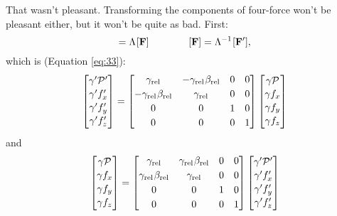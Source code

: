 \documentclass[12pt]{article}
\renewcommand{\vv}[1]{\mathbf{#1}}
\begin{document}
That wasn't pleasant. Transforming the components of four-force won't be pleasant either, but it won't be quite as bad. First:
\begin{equation*}
[\vv F^\prime] = \Lambda \mkern1mu [\vv F] \qquad \qquad [\vv F] = \Lambda^{-1} \mkern1mu [\vv F^\prime] ,
\end{equation*}
which is (Equation \ref{eq:33}):
\begin{equation*}
\begin{bmatrix}
\gamma^\prime \mathcal{P}^\prime \\[.15 em]
\gamma^\prime f_x^\prime \\[.15 em]
\gamma^\prime f_y^\prime \\[.15 em]
\gamma^\prime f_z^\prime\\[.1 em]
\end{bmatrix}
=
\begin{bmatrix}
\gamma_{\textrm{rel}} & -\gamma_{\textrm{rel}} \mkern1mu \beta_{\textrm{rel}} & 0 & 0 \\[.25 em]
- \gamma_{\textrm{rel}} \mkern1mu \beta_{\textrm{rel}} & \gamma_{\textrm{rel}} & 0 & 0 \\[.25 em]
0 & 0 & 1 & 0 \\[.25 em]
0 & 0 & 0 & 1
\end{bmatrix}
\begin{bmatrix}
\gamma \mathcal{P} \\[.15 em]
\gamma f_x \\[.15 em]
\gamma f_y \\[.15 em]
\gamma f_z \\[.1 em]
\end{bmatrix}
\end{equation*}
and
\begin{equation*}
\begin{bmatrix}
\gamma \mathcal{P} \\[.15 em]
\gamma f_x \\[.15 em]
\gamma f_y \\[.15 em]
\gamma f_z \\[.1 em]
\end{bmatrix}
=
\begin{bmatrix}
\gamma_{\textrm{rel}} & \gamma_{\textrm{rel}} \mkern1mu \beta_{\textrm{rel}} & 0 & 0 \\[.25 em]
\gamma_{\textrm{rel}} \mkern1mu \beta_{\textrm{rel}} & \gamma_{\textrm{rel}} & 0 & 0 \\[.25 em]
0 & 0 & 1 & 0 \\[.25 em]
0 & 0 & 0 & 1
\end{bmatrix}
\begin{bmatrix}
\gamma^\prime \mathcal{P}^\prime \\[.15 em]
\gamma^\prime f_x^\prime \\[.15 em]
\gamma^\prime f_y^\prime \\[.15 em]
\gamma^\prime f_z^\prime\\[.1 em]
\end{bmatrix}
\end{equation*}
\end{document}
